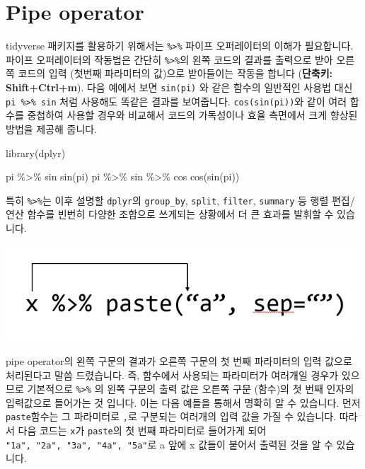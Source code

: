 \documentclass[
]{book}
\newenvironment{Shaded}{\begin{snugshade}}{\end{snugshade}}
\newcommand{\FunctionTok}[1]{\textcolor[rgb]{0.00,0.00,0.00}{#1}}
\newcommand{\NormalTok}[1]{#1}
\newcommand{\SpecialCharTok}[1]{\textcolor[rgb]{0.00,0.00,0.00}{#1}}
\begin{document}
\hypertarget{pipe-operator}{%
\section{Pipe operator}\label{pipe-operator}}

tidyverse 패키지를 활용하기 위해서는 \texttt{\%\textgreater{}\%} 파이프 오퍼레이터의 이해가 필요합니다. 파이프 오퍼레이터의 작동법은 간단히 \texttt{\%\textgreater{}\%}의 왼쪽 코드의 결과를 출력으로 받아 오른쪽 코드의 입력 (첫번째 파라미터의 값)으로 받아들이는 작동을 합니다 (\textbf{단축키: Shift+Ctrl+m}). 다음 예에서 보면 \texttt{sin(pi)} 와 같은 함수의 일반적인 사용법 대신 \texttt{pi\ \%\textgreater{}\%\ sin} 처럼 사용해도 똑같은 결과를 보여줍니다. \texttt{cos(sin(pi))}와 같이 여러 합수를 중첩하여 사용할 경우와 비교해서 코드의 가독성이나 효율 측면에서 크게 향상된 방법을 제공해 줍니다.

\begin{Shaded}
\begin{Highlighting}[]
\FunctionTok{library}\NormalTok{(dplyr)}

\NormalTok{pi }\SpecialCharTok{\%\textgreater{}\%}\NormalTok{ sin}
\FunctionTok{sin}\NormalTok{(pi)}
\NormalTok{pi }\SpecialCharTok{\%\textgreater{}\%}\NormalTok{ sin }\SpecialCharTok{\%\textgreater{}\%}\NormalTok{ cos}
\FunctionTok{cos}\NormalTok{(}\FunctionTok{sin}\NormalTok{(pi))}
\end{Highlighting}
\end{Shaded}

특히 \texttt{\%\textgreater{}\%}는 이후 설명할 \texttt{dplyr}의 \texttt{group\_by}, \texttt{split}, \texttt{filter}, \texttt{summary} 등 행렬 편집/연산 함수를 빈번히 다양한 조합으로 쓰게되는 상황에서 더 큰 효과를 발휘할 수 있습니다.

\includegraphics[width=5.20833in,height=\textheight]{images/07/02.PNG}

pipe operator의 왼쪽 구문의 결과가 오른쪽 구문의 첫 번째 파라미터의 입력 값으로 처리된다고 말씀 드렸습니다. 즉, 함수에서 사용되는 파라미터가 여러개일 경우가 있으므로 기본적으로 \texttt{\%\textgreater{}\%} 의 왼쪽 구문의 출력 값은 오른쪽 구문 (함수)의 첫 번째 인자의 입력값으로 들어가는 것 입니다. 이는 다음 예들을 통해서 명확히 알 수 있습니다. 먼저 \texttt{paste}함수는 그 파라미터로 \texttt{,}로 구분되는 여러개의 입력 값을 가질 수 있습니다. 따라서 다음 코드는 \texttt{x}가 \texttt{paste}의 첫 번째 파라미터로 들어가게 되어 \texttt{"1a",\ "2a",\ "3a",\ "4a",\ "5a"}로 a 앞에 x 값들이 붙어서 출력된 것을 알 수 있습니다.
\end{document}
